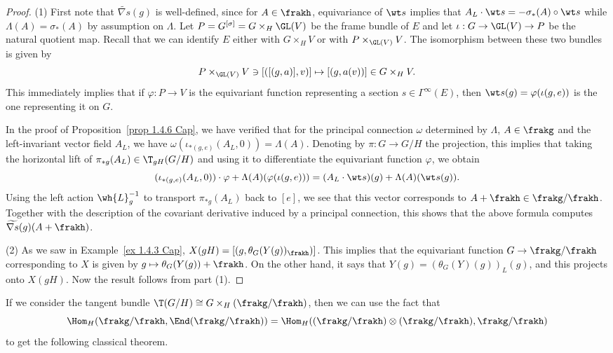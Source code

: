 \begin{proof}
    (1) First note that $\widetilde{\nabla s}(g)$ is well-defined, since for $A\in\frakh$, equivariance of $\wt s$ implies that $A_L\cdot \wt s=-\sigma_\ast(A)\circ \wt s$ while $\Lambda(A)=\sigma_\ast(A)$ by assumption on $\Lambda$. Let $P=G^{[\sigma]}=G\times_H \GL(V)$ be the frame bundle of $E$ and let $\iota:G\to \GL(V)\to P$ be the natural quotient map. Recall that we can identify $E$ either with $G\times_H V$ or with $P\times_{\GL(V)}V$. The isomorphism between these two bundles is given by 
    \[P\times_{\GL(V)} V\ni [([(g,a)],v)]\mapsto [(g,a(v))]\in G\times_H V.\]
    This immediately implies that if $\varphi:P\to V$ is the equivariant function representing a section $s\in\Gamma^\infty(E)$, then $\wt s(g)=\varphi(\iota(g,e))$ is the one representing it on $G$.

    In the proof of Proposition~\ref{prop 1.4.6 Cap}, we have verified that for the principal connection $\omega$ determined by $\Lambda$, $A\in\frakg$  and the left-invariant vector field $A_L$, we have $\omega(\iota_{\ast(g,e)}(A_L,0))=\Lambda(A)$. Denoting by $\pi:G\to G\slash H$ the projection, this implies that taking the horizontal lift of $\pi_{\ast g}(A_L)\in \T_{gH}(G\slash H)$ and using it to differentiate the equivariant function $\varphi$, we obtain 
    \[(\iota_{\ast(g,e)}(A_L,0))\cdot\varphi+\Lambda(A)(\varphi(\iota(g,e)))=(A_L\cdot \wt s)(g)+\Lambda(A)(\wt s(g)).\]
    Using the left action $\wh{L}_g^{-1}$ to transport $\pi_{\ast g}(A_L)$ back to $[e]$, we see that this vector corresponds to $A+\frakh\in\frakg\slash\frakh$. Together with the description of the covariant derivative induced by a principal connection, this shows that the above formula computes $\widetilde{\nabla s}(g)(A+\frakh)$.

    (2) As we saw in Example~\ref{ex 1.4.3 Cap}, $X(gH)=[(g,\theta_G(Y(g))_\frakh)]$. This implies that the equivariant function $G\to \frakg\slash \frakh$ corresponding to $X$ is given by $g\mapsto \theta_G(Y(g))+\frakh$. On the other hand, it says that $Y(g)=(\theta_G(Y)(g))_L(g)$, and this projects onto $X(gH)$. Now the result follows from part (1).
\end{proof}

If we consider the tangent bundle $\T(G\slash H)\cong G\times_{H}(\frakg\slash\frakh)$,  then we can use the fact that 
\[\Hom_H(\frakg\slash\frakh,\End(\frakg\slash\frakh))=\Hom_H((\frakg\slash\frakh)\otimes (\frakg\slash\frakh),\frakg\slash\frakh)\]
to get the following classical theorem.

